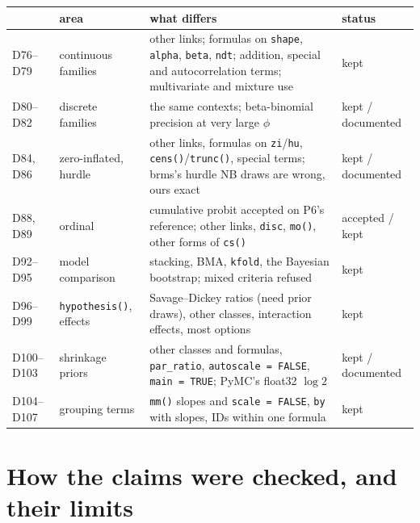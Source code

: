 \documentclass[11pt]{article}
\newcommand{\code}[1]{\texttt{#1}}
\begin{document}
\small
\begin{center}\begin{tabular}{@{}>{\raggedright\arraybackslash}p{}>{\raggedright\arraybackslash}p{}>{\raggedright\arraybackslash}p{}>{\raggedright\arraybackslash}p{}@{}}
\toprule
& area & what differs & status \\
\midrule
D76--D79 & continuous families & other links; formulas on \code{shape}, \code{alpha}, \code{beta}, \code{ndt}; addition, special and autocorrelation terms; multivariate and mixture use & kept \\
D80--D82 & discrete families & the same contexts; beta-binomial precision at very large $\phi$ & kept / documented \\
D84, D86 & zero-inflated, hurdle & other links, formulas on \code{zi}/\code{hu}, \code{cens()}/\code{trunc()}, special terms; brms's hurdle NB draws are wrong, ours exact & kept / documented \\
D88, D89 & ordinal & cumulative probit accepted on P6's reference; other links, \code{disc}, \code{mo()}, other forms of \code{cs()} & accepted / kept \\
D92--D95 & model comparison & stacking, BMA, \code{kfold}, the Bayesian bootstrap; mixed criteria refused & kept \\
D96--D99 & \code{hypothesis()}, effects & Savage--Dickey ratios (need prior draws), other classes, interaction effects, most options & kept \\
D100--D103 & shrinkage priors & other classes and formulas, \code{par\_ratio}, \code{autoscale = FALSE}, \code{main = TRUE}; PyMC's float32 $\log 2$ & kept / documented \\
D104--D107 & grouping terms & \code{mm()} slopes and \code{scale = FALSE}, \code{by} with slopes, IDs within one formula & kept \\
\bottomrule
\end{tabular}\end{center}
\normalsize

\section{How the claims were checked, and their limits}
\label{sec:verification}
\end{document}

